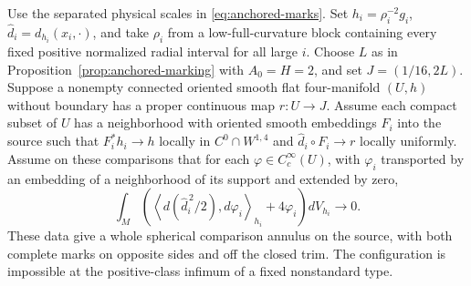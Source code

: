 \begin{proposition}\label{prop:radial-distance-test}
Use the separated physical scales in \eqref{eq:anchored-marks}.
Set \(h_i=\rho_i^{-2}g_i\), \(\widehat d_i=d_{h_i}(x_i,\cdot)\),
and take \(\rho_i\) from a low-full-curvature block containing every
fixed positive normalized radial interval for all large \(i\).
Choose \(L\) as in Proposition~\ref{prop:anchored-marking} with
\(A_0=H=2\), and set \(J=(1/16,2L)\).
Suppose a nonempty connected oriented smooth flat four-manifold
\((U,h)\) without boundary has a proper continuous map \(r:U\to J\).
Assume each compact
subset of \(U\) has a neighborhood with oriented smooth
embeddings \(F_i\) into the source such that \(F_i^*h_i\to h\)
locally in \(C^0\cap W^{1,4}\) and \(\widehat d_i\circ F_i\to r\)
locally uniformly. Assume on these comparisons that for each
\(\varphi\in C^\infty_c(U)\), with \(\varphi_i\) transported by
an embedding of a neighborhood of its support and extended by zero,
\begin{equation}\label{eq:radial-distance-test}
 \int_M\left(
 \left\langle d(\widehat d_i^{\,2}/2),d\varphi_i\right\rangle_{h_i}
 +4\varphi_i\right)dV_{h_i}\longrightarrow0 .
\end{equation}
These data give a whole spherical comparison annulus on the
source, with both complete marks on opposite sides and off
the closed trim. The configuration is impossible at the
positive-class infimum of a fixed nonstandard type.
\end{proposition}

